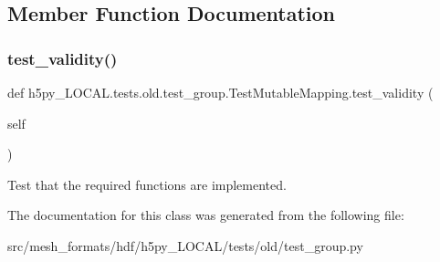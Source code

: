 \subsection{Member Function Documentation}
\mbox{\label{classh5py__LOCAL_1_1tests_1_1old_1_1test__group_1_1TestMutableMapping_a826e20edb2ce2121e69f57eb0aa9e145}} 
\subsubsection{\texorpdfstring{test\+\_\+validity()}{test\_validity()}}
{\footnotesize\ttfamily def h5py\+\_\+\+L\+O\+C\+A\+L.\+tests.\+old.\+test\+\_\+group.\+Test\+Mutable\+Mapping.\+test\+\_\+validity (\begin{DoxyParamCaption}\item[{}]{self }\end{DoxyParamCaption})}

\begin{DoxyVerb}Test that the required functions are implemented.
\end{DoxyVerb}
 

The documentation for this class was generated from the following file\+:\begin{DoxyCompactItemize}
\item 
src/mesh\+\_\+formats/hdf/h5py\+\_\+\+L\+O\+C\+A\+L/tests/old/test\+\_\+group.\+py\end{DoxyCompactItemize}
